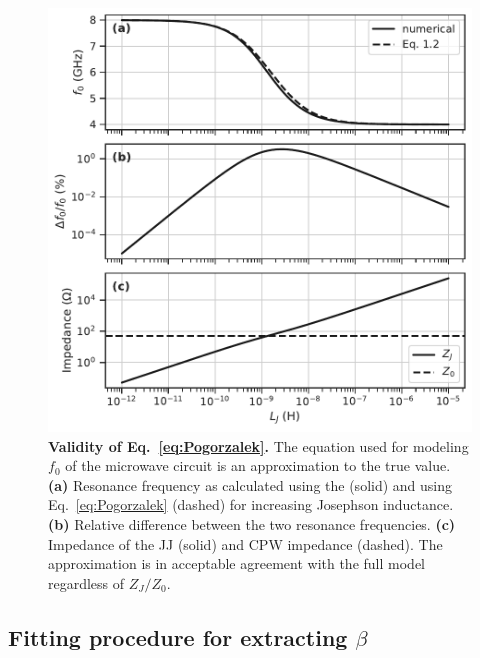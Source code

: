 \begin{figure}
	\centering
	\includegraphics[width=0.5\linewidth]{chapter-gJJ-CPR/figs/SMFigure-validity}
	\caption{
		\textbf{Validity of Eq.~\ref{eq:Pogorzalek}.}
		The equation used for modeling $f_0$ of the microwave circuit is an approximation to the true value.
		\textbf{(a)} Resonance frequency as calculated using the  (solid) and using Eq.~\ref{eq:Pogorzalek} (dashed) for increasing Josephson inductance.
		\textbf{(b)} Relative difference between the two resonance frequencies.
		\textbf{(c)} Impedance of the JJ (solid) and CPW impedance (dashed).
		The approximation is in acceptable agreement with the full model regardless of $Z_J/Z_0$.
	}
	\label{fig:SMval}
\end{figure}


\subsection{Fitting procedure for extracting $\beta$}\label{sec:SMduffing}

